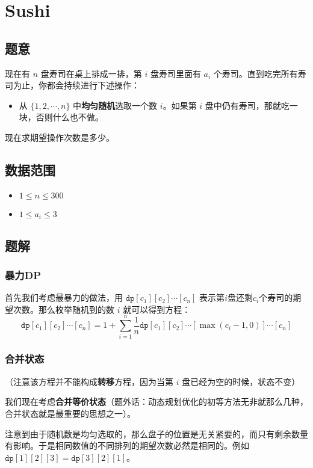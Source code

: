 \section{Sushi}
\subsection*{题意}
现在有 $n$ 盘寿司在桌上排成一排，第 $i$ 盘寿司里面有 $a_i$ 个寿司。直到吃完所有寿司为止，你都会持续进行下述操作：
\begin{itemize}
\item 从 $\{1,2,\cdots,n\}$ 中\textbf{均匀随机}选取一个数 $i$。如果第 $i$ 盘中仍有寿司，那就吃一块，否则什么也不做。
\end{itemize}

现在求期望操作次数是多少。

\subsection*{数据范围}
\begin{itemize}
\item $1 \leq n \leq 300$
\item $1 \leq a_i \leq 3$
\end{itemize}

\subsection*{题解}

\subsubsection*{暴力DP}
首先我们考虑最暴力的做法，用 ${\texttt{dp}}[c_1][c_2]\cdots[c_n]$ 表示第$i$盘还剩$c_i$个寿司的期望次数。那么枚举随机到的数 $i$ 就可以得到方程：
$$
{\texttt{dp}}[c_1][c_2]\cdots[c_n] = 1+\sum_{i = 1}^n \frac{1}{n }{\texttt{dp}}[c_1][c_2]\cdots[\max(c_i-1,0)]\cdots[c_n]
$$

\subsubsection*{合并状态}
（注意该方程并不能构成\textbf{转移}方程，因为当第 $i$ 盘已经为空的时候，状态不变）

我们现在考虑\textbf{合并等价状态}（题外话：动态规划优化的初等方法无非就那么几种，合并状态就是最重要的思想之一）。

注意到由于随机数是均匀选取的，那么盘子的位置是无关紧要的，而只有剩余数量有影响。于是相同数值的不同排列的期望次数必然是相同的。例如${\texttt{dp}}[1][2][3] = {\texttt{dp}}[3][2][1]$。

